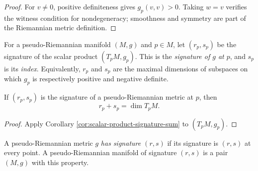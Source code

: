 \begin{proof}

\sketch For $v\ne0$, positive definiteness gives $g_p(v,v)>0$. Taking $w=v$
verifies the witness condition for nondegeneracy; smoothness and symmetry are part
of the Riemannian metric definition.
\end{proof}

\begin{definition}
\label{def:pseudo-metric-signature-at}





For a pseudo-Riemannian manifold $(M,g)$ and $p\in M$, let $(r_p,s_p)$ be the
signature of the scalar product $(T_pM,g_p)$. This is the \emph{signature of $g$
at $p$}, and $s_p$ is its \emph{index}. Equivalently, $r_p$ and $s_p$ are the
maximal dimensions of subspaces on which $g_p$ is respectively positive and
negative definite.
\end{definition}

\begin{proposition}
\label{prop:pseudo-metric-signature-sum}





If $(r_p,s_p)$ is the signature of a pseudo-Riemannian metric at $p$, then
\[
r_p+s_p=\dim T_pM.
\]
\end{proposition}

\begin{proof}

\sketch Apply Corollary \ref{cor:scalar-product-signature-sum} to $(T_pM,g_p)$.
\end{proof}

\begin{definition}
\label{def:pseudo-metric-has-signature}





A pseudo-Riemannian metric $g$ \emph{has signature $(r,s)$} if its signature is
$(r,s)$ at every point. A pseudo-Riemannian manifold of signature $(r,s)$ is a
pair $(M,g)$ with this property.
\end{definition}

